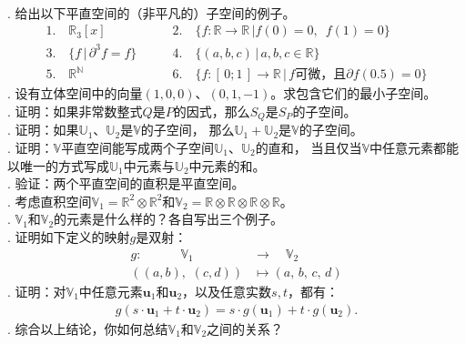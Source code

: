 \documentclass[12pt,UTF8,fontset=none]{ctexbook}
\begin{document}
\begin{xt}
    \mbox{} \\
    . 给出以下平直空间的（非平凡的）子空间的例子。
    $$
    \begin{array}{ll}
        1. \quad \mathbb{R}_3[x] & \qquad 2. \quad \{f: \mathbb{R} \rightarrow \mathbb{R} \, | f(0) = 0, \,\,\, f(1) = 0\} \\
        3. \quad \{f \, | \, \partial^3 f = f\} & \qquad 4. \quad \{(a, b, c) \, | \, a, b, c \in \mathbb{R}\} \\
        5. \quad \mathbb{R}^\mathbb{N} & \qquad 6. \quad \{f: [\,0;1\,] \rightarrow \mathbb{R} \, | \, f \mbox{可微，且} \partial f(0.5) = 0\}
    \end{array}
    $$
    . 设有立体空间中的向量$(1, 0, 0)$、$(0, 1, -1)$。求包含它们的最小子空间。\\
    . 证明：如果非常数整式$Q$是$P$的因式，那么$S_Q$是$S_P$的子空间。\\
    . 证明：如果$\mathbb{U}_1$、$\mathbb{U}_2$是$\mathbb{V}$的子空间，
    那么$\mathbb{U}_1 + \mathbb{U}_2$是$\mathbb{V}$的子空间。\\
    . 证明：$\mathbb{V}$平直空间能写成两个子空间$\mathbb{U}_1$、$\mathbb{U}_2$的直和，
    当且仅当$\mathbb{V}$中任意元素都能以唯一的方式写成$\mathbb{U}_1$中元素与$\mathbb{U}_2$中元素的和。\\
    . 验证：两个平直空间的直积是平直空间。\\
    . 考虑直积空间$\mathbb{V}_1 = \mathbb{R}^2\otimes \mathbb{R}^2$和$\mathbb{V}_2 = \mathbb{R}\otimes \mathbb{R}\otimes \mathbb{R}\otimes \mathbb{R}$。\\
    . $\mathbb{V}_1$和$\mathbb{V}_2$的元素是什么样的？各自写出三个例子。\\
    . 证明如下定义的映射$g$是双射：
    \begin{align*}
        g:\quad \qquad \mathbb{V}_1 \qquad &\rightarrow \quad \mathbb{V}_2 \\
        ((a,b), \,\, (c,d)) &\mapsto (a, \,b, \,c, \,d)
    \end{align*}
    . 证明：对$\mathbb{V}_1$中任意元素$\mathbf{u}_1$和$\mathbf{u}_2$，以及任意实数$s, t$，都有：
    \begin{align*}
        g(s\cdot \mathbf{u}_1 + t\cdot \mathbf{u}_2) = s\cdot g(\mathbf{u}_1) + t\cdot g(\mathbf{u}_2).
    \end{align*}
    . 综合以上结论，你如何总结$\mathbb{V}_1$和$\mathbb{V}_2$之间的关系？\\
\end{xt}
\end{document}
